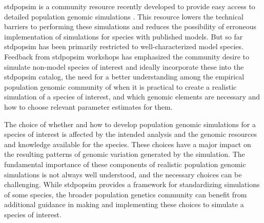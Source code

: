 \documentclass[hidelinks]{article}
\begin{document}
stdpopsim is a community resource recently developed to provide easy
access to detailed population genomic simulations \citep{Adrion2020}. This
resource lowers the technical barriers to performing these simulations
and reduces the possibility of erroneous implementation of simulations
for species with published models. But so far stdpopsim has been
primarily restricted to well-characterized model species. Feedback from
stdpopsim workshops has emphasized the community desire to simulate
non-model species of interest and ideally incorporate these into the stdpopsim catalog,
the need for a better understanding among the empirical population
genomic community of when it is practical to create a realistic
simulation of a species of interest, and which genomic elements are
necessary and how to choose relevant parameter estimates for them.

The choice of whether and how to develop population genomic
simulations for a species of interest is affected by the intended
analysis and the genomic resources and knowledge available for the
species. These choices have a major impact on the resulting patterns of
genomic variation generated by the simulation. The fundamental
importance of these components of realistic population genomic
simulations is not always well understood, and the necessary choices can
be challenging. While stdpopsim provides a framework for standardizing
simulations of some species, the broader population genetics community
can benefit from additional guidance in making and implementing these
choices to simulate a species of interest.
\end{document}
